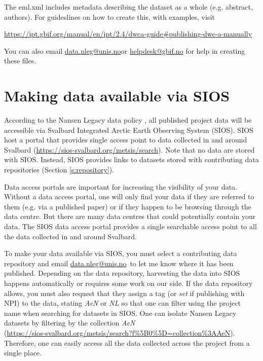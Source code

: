 \documentclass[a4paper,english, 11pt]{article}
\makeatletter
\newcommand{\emailme}{\href{mailto:data.nleg@unis.no}{data.nleg@unis.no}}
\makeatother
\begin{document}
The eml.xml includes metadata describing the dataset as a whole (e.g. abstract, authors). For guideslines on how to create this, with examples, visit

\url{https://ipt.gbif.org/manual/en/ipt/2.4/dwca-guide#publishing-dwc-a-manually}

You can also email \emailme or \href{mailto:helpdesk@gbif.no}{helpdesk@gbif.no} for help in creating these files.

\newpage
\section{Making data available via SIOS}
\label{s:SIOS}

According to the Nansen Legacy data policy \citep{aendatapolicy2021}, all published project data will be accessible via Svalbard Integrated Arctic Earth Observing System (SIOS). SIOS host a portal that provides single access point to data collected in and around Svalbard (\url{https://sios-svalbard.org/metsis/search}).
Note that no data are stored with SIOS. Instead, SIOS provides links to datasets stored with contributing data repositories (Section \ref{s:repository}). 

Data access portals are important for increasing the visibility of your data. Without a data access portal, one will only find your data if they are referred to them (e.g. via a published paper) or if they happen to be browsing through the data centre. But there are many data centres that could potentially contain your data. The SIOS data access portal provides a single searchable access point to all the data collected in and around Svalbard.

To make your data available via SIOS, you must select a contributing data repository and email \emailme \ to let me know where it has been published. Depending on the data repository, harvesting the data into SIOS happens automatically or requires some work on our side. If the data repository allows, you must also request that they assign a tag (or \textit{set} if publishing with NPI) to the data, stating \textit{AeN} or \textit{NL} so that one can filter using the project name when searching for datasets in SIOS. One can isolate Nansen Legacy datasets by filtering by the collection \textit{AeN} \\ 
(\url{https://sios-svalbard.org/metsis/search?f%5B0%5D=collection%3AAeN}). 
Therefore, one can easily access all the data collected across the project from a single place.  
\end{document}
